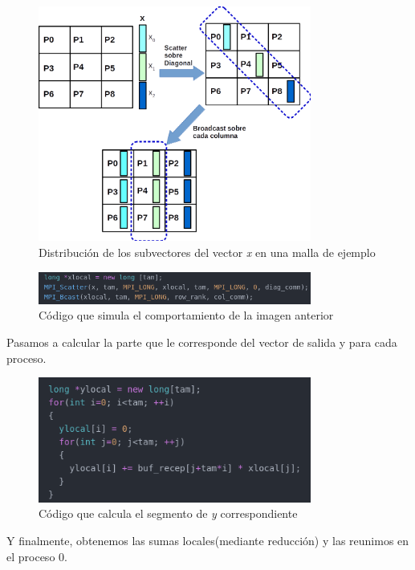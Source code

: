 \begin{figure}[H]
\centering
\includegraphics[width=0.8\textwidth]{imagenes/2.png}
\caption{Distribución de los subvectores del vector \textit{x} en una malla de ejemplo}
\end{figure}

\begin{figure}[H]
\centering
\includegraphics[width=0.8\textwidth]{imagenes/scatter-bcast-x.png}
\caption{Código que simula el comportamiento de la imagen anterior}
\end{figure}

Pasamos a calcular la parte que le corresponde del vector de salida y para cada proceso.

\begin{figure}[H]
\centering
\includegraphics[width=0.8\textwidth]{imagenes/calculo-ylocal.png}
\caption{Código que calcula el segmento de \textit{y} correspondiente}
\end{figure}

Y finalmente, obtenemos las sumas locales(mediante reducción) y las reunimos en el proceso 0.

